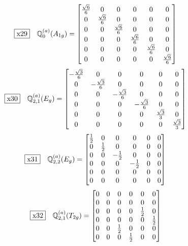 \documentclass[fleqn,10pt,landscape]{jsarticle}
\begin{document}
\begin{dmath*}
\fbox{x29}\quad \mathbb{Q}_{0}^{(a)}(A_{1g})=\begin{bmatrix} \frac{\sqrt{6}}{6} & 0 & 0 & 0 & 0 & 0 \\ 0 & \frac{\sqrt{6}}{6} & 0 & 0 & 0 & 0 \\ 0 & 0 & \frac{\sqrt{6}}{6} & 0 & 0 & 0 \\ 0 & 0 & 0 & \frac{\sqrt{6}}{6} & 0 & 0 \\ 0 & 0 & 0 & 0 & \frac{\sqrt{6}}{6} & 0 \\ 0 & 0 & 0 & 0 & 0 & \frac{\sqrt{6}}{6} \end{bmatrix}
\end{dmath*}
\begin{dmath*}
\fbox{x30}\quad \mathbb{Q}_{2,1}^{(a)}(E_{g})=\begin{bmatrix} - \frac{\sqrt{3}}{6} & 0 & 0 & 0 & 0 & 0 \\ 0 & - \frac{\sqrt{3}}{6} & 0 & 0 & 0 & 0 \\ 0 & 0 & - \frac{\sqrt{3}}{6} & 0 & 0 & 0 \\ 0 & 0 & 0 & - \frac{\sqrt{3}}{6} & 0 & 0 \\ 0 & 0 & 0 & 0 & \frac{\sqrt{3}}{3} & 0 \\ 0 & 0 & 0 & 0 & 0 & \frac{\sqrt{3}}{3} \end{bmatrix}
\end{dmath*}
\begin{dmath*}
\fbox{x31}\quad \mathbb{Q}_{2,2}^{(a)}(E_{g})=\begin{bmatrix} \frac{1}{2} & 0 & 0 & 0 & 0 & 0 \\ 0 & \frac{1}{2} & 0 & 0 & 0 & 0 \\ 0 & 0 & - \frac{1}{2} & 0 & 0 & 0 \\ 0 & 0 & 0 & - \frac{1}{2} & 0 & 0 \\ 0 & 0 & 0 & 0 & 0 & 0 \\ 0 & 0 & 0 & 0 & 0 & 0 \end{bmatrix}
\end{dmath*}
\begin{dmath*}
\fbox{x32}\quad \mathbb{Q}_{2,1}^{(a)}(T_{2g})=\begin{bmatrix} 0 & 0 & 0 & 0 & 0 & 0 \\ 0 & 0 & 0 & 0 & 0 & 0 \\ 0 & 0 & 0 & 0 & \frac{1}{2} & 0 \\ 0 & 0 & 0 & 0 & 0 & \frac{1}{2} \\ 0 & 0 & \frac{1}{2} & 0 & 0 & 0 \\ 0 & 0 & 0 & \frac{1}{2} & 0 & 0 \end{bmatrix}
\end{dmath*}
\end{document}
